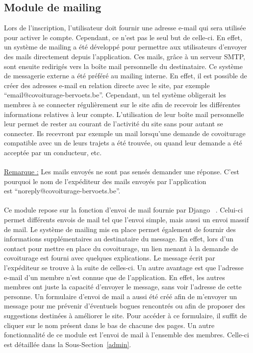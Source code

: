 \documentclass[12pt, a4paper, oneside]{article}
\begin{document}
\subsection{Module de mailing} \label{mail}
    Lors de l'inscription, l'utilisateur doit fournir une adresse e-mail qui sera utilisée pour activer le compte. Cependant, ce n'est pas le seul but de celle-ci. En effet, un système de mailing a été développé pour permettre aux utilisateurs d'envoyer des mails directement depuis l'application. Ces mails, grâce à un serveur SMTP, sont ensuite redirigés vers la boîte mail personnelle du destinataire. Ce système de messagerie externe a été préféré au mailing interne. En effet, il est possible de créer des adresses e-mail en relation directe avec le site, par exemple ``email@covoiturage-bervoets.be''. Cependant, un tel système obligerait les membres à se connecter régulièrement sur le site afin de recevoir les différentes informations relatives à leur compte. L'utilisation de leur boîte mail personnelle leur permet de rester au courant de l'activité du site sans pour autant se connecter. Ils recevront par exemple un mail lorsqu'une demande de covoiturage compatible avec un de leurs trajets a été trouvée, ou quand leur demande a été acceptée par un conducteur, etc.\\\\
    \underline{Remarque :} Les mails envoyés ne sont pas sensés demander une réponse. C'est pourquoi le nom de l'expéditeur des mails envoyés par l'application \\est ``noreply@covoiturage-bervoets.be''.\\\\
    \indent Ce module repose sur la fonction d'envoi de mail fournie par Django ~\cite{django-mail}. Celui-ci permet différents envois de mail tel que l'envoi simple, mais aussi un envoi massif de mail.
    Le système de mailing mis en place permet également de fournir des informations supplémentaires au destinataire du message. En effet, lors d'un contact pour mettre en place du covoiturage, un lien menant à la demande de covoiturage est fourni avec quelques explications. Le message écrit par l'expéditeur se trouve à la suite de celles-ci. Un autre avantage est que l'adresse e-mail d'un membre n'est connue que de l'application. En effet, les autres membres ont juste la capacité d'envoyer le message, sans voir l'adresse de cette personne. Un formulaire d'envoi de mail a aussi été créé afin de m'envoyer un message pour me prévenir d'éventuels bogues rencontrés ou afin de proposer des suggestions destinées à améliorer le site. Pour accéder à ce formulaire, il suffit de cliquer sur le nom présent dans le bas de chacune des pages. Un autre fonctionnalité de ce module est l'envoi de mail à l'ensemble des membres. Celle-ci est détaillée dans la Sous-Section~\ref{admin}.\\\\
\end{document}
